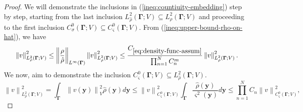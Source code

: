 \documentclass[final,onefignum,onetabnum]{mousaviart}
\begin{document}
		\vspace*{1mm}
		\begin{proof}
			We will demonstrate the inclusions in (\ref{ineq:countiuity-embedding}) step by step, starting from the last inclusion $	L^2_{\hat{\rho}}(\boldsymbol{\Gamma}; V) \subseteq L^2_{\rho}(\boldsymbol{\Gamma}; V)$ and proceeding to the first inclusion $C_\sigma^0(\boldsymbol{\Gamma}; V) \subseteq C_\varsigma^0(\boldsymbol{\Gamma}; V) $.
			From (\ref{ineq:upper-bound-rho-on-hat}), we have
			\begin{equation*}
				\left\| v\right\|_{L^2_{\rho}(\boldsymbol{\Gamma}; V)}^2
				\leq
				\left\| \dfrac{\rho}{\hat{\rho}}\right\| _{L^\infty(\boldsymbol{\Gamma})} 
				\left\| v\right\|_{L^2_{\hat{\rho}}(\boldsymbol{\Gamma}; V)}^2
				\leq
				\dfrac{C_{\ref{eq:density-func-assum}}}{\prod_{n=1}^N C^{m}_n}
				\left\| v\right\|_{L^2_{\hat{\rho}}(\boldsymbol{\Gamma}; V)}^2.
			\end{equation*}
			We now, aim to demonstrate the inclusion $C_\varsigma^0(\boldsymbol{\Gamma}; V) \subseteq L^2_{\hat{\rho}}(\boldsymbol{\Gamma}; V)$.
			\begin{equation*}
				\left\| v\right\|_{L^2_{\hat{\rho}}(\boldsymbol{\Gamma}; V)}^2 = \int_{\boldsymbol{\Gamma}} \left\|  v(\boldsymbol{y}) \right\|_V^2  \hat{\rho}(\boldsymbol{y}) d\boldsymbol{y} 
				\leq
				\left\| v\right\|^2_{C_\varsigma^0(\boldsymbol{\Gamma}; V)} \int_{\boldsymbol{\Gamma}} \dfrac{\hat{\rho}(\boldsymbol{y})}{\varsigma^2(\boldsymbol{y})} d\boldsymbol{y} 
				\leq
				\prod_{n=1}^N C_n 
				\left\|v\right\|^2_{C_\varsigma^0(\boldsymbol{\Gamma}; V)},
			\end{equation*}

\end{proof}
\end{document}
